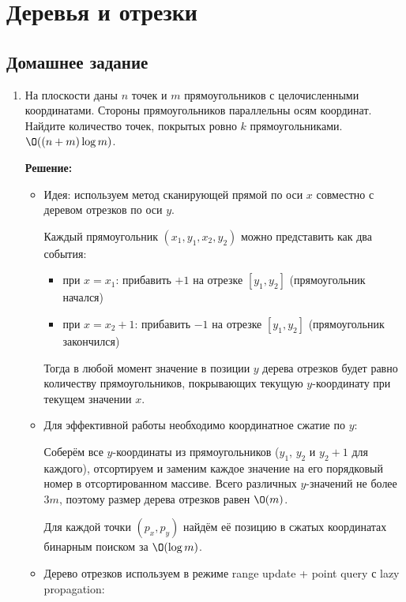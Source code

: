 \section{Деревья и отрезки}

\subsection{Домашнее задание}
\begin{enumerate}
  \item
    На плоскости даны $n$ точек и $m$ прямоугольников с целочисленными координатами. Стороны прямоугольников
    параллельны осям координат. Найдите количество точек, покрытых ровно $k$ прямоугольниками. $\O((n + m)\log{m})$.

    \textbf{Решение:}

    \begin{itemize}
      \item Идея: используем метод сканирующей прямой по оси $x$ совместно с деревом отрезков по оси $y$.

      Каждый прямоугольник $(x_1, y_1, x_2, y_2)$ можно представить как два события:
      \begin{itemize}
        \item при $x = x_1$: прибавить $+1$ на отрезке $[y_1, y_2]$ (прямоугольник начался)

        \item при $x = x_2 + 1$: прибавить $-1$ на отрезке $[y_1, y_2]$ (прямоугольник закончился)
      \end{itemize}

      Тогда в любой момент значение в позиции $y$ дерева отрезков будет равно количеству прямоугольников,
      покрывающих текущую $y$-координату при текущем значении $x$.

      \item Для эффективной работы необходимо координатное сжатие по $y$:

      Соберём все $y$-координаты из прямоугольников ($y_1$, $y_2$ и $y_2 + 1$ для каждого), отсортируем 
      и заменим каждое значение на его порядковый номер в отсортированном массиве.
      Всего различных $y$-значений не более $3m$, поэтому размер дерева отрезков равен $\O(m)$.
      
      Для каждой точки $(p_x, p_y)$ найдём её позицию в сжатых координатах бинарным поиском за $\O(\log m)$.

      \item Дерево отрезков используем в режиме range update + point query с lazy propagation:


\end{itemize}
\end{enumerate}

